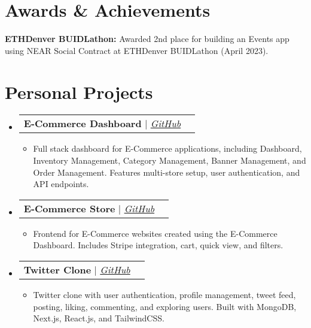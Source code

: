 \documentclass[letterpaper,11pt]{article}
\makeatletter
\newcommand{\resumeItem}[1]{
  \item\small{
    {#1 \vspace{-2pt}}
  }
}
\newcommand{\resumeProjectHeading}[2]{
    \vspace{-2pt}\item
    \begin{tabular*}{0.97\textwidth}{l@{\extracolsep{\fill}}r}
      \small#1 & #2 \\
    \end{tabular*}\vspace{-7pt}
}
\newcommand{\resumeSubHeadingListStart}{\begin{itemize}[leftmargin=0.15in, label={}]}
\newcommand{\resumeSubHeadingListEnd}{\end{itemize}}
\newcommand{\resumeItemListStart}{\begin{itemize}}
\newcommand{\resumeItemListEnd}{\end{itemize}\vspace{-5pt}}
\makeatother
\begin{document}

\section{Awards \& Achievements}
\vspace{2pt}
\resumeSubHeadingListStart
\small{\item{
              \textbf{ETHDenver BUIDLathon:} Awarded 2nd place for building an Events app using NEAR Social Contract at ETHDenver BUIDLathon (April 2023). \\ \vspace{3pt}
        }}
\resumeSubHeadingListEnd


\section{Personal Projects}
\vspace{3pt}
\resumeSubHeadingListStart

\resumeProjectHeading
{\textbf{E-Commerce Dashboard} $|$ \emph{\href{https://github.com/itexpert120/e-commerce-admin}{\color{blue}GitHub}}}{}
\resumeItemListStart
\resumeItem{Full stack dashboard for E-Commerce applications, including Dashboard, Inventory Management, Category Management, Banner Management, and Order Management. Features multi-store setup, user authentication, and API endpoints.}
\resumeItemListEnd

\resumeProjectHeading
{\textbf{E-Commerce Store} $|$ \emph{\href{https://github.com/itexpert120/e-commerce-store}{\color{blue}GitHub}}}{}
\resumeItemListStart
\resumeItem{Frontend for E-Commerce websites created using the E-Commerce Dashboard. Includes Stripe integration, cart, quick view, and filters.}
\resumeItemListEnd

\resumeProjectHeading
{\textbf{Twitter Clone} $|$ \emph{\href{https://github.com/itexpert120/twitter-clone}{\color{blue}GitHub}}}{}
\resumeItemListStart
\resumeItem{Twitter clone with user authentication, profile management, tweet feed, posting, liking, commenting, and exploring users. Built with MongoDB, Next.js, React.js, and TailwindCSS.}
\resumeItemListEnd

\resumeSubHeadingListEnd

\end{document}
